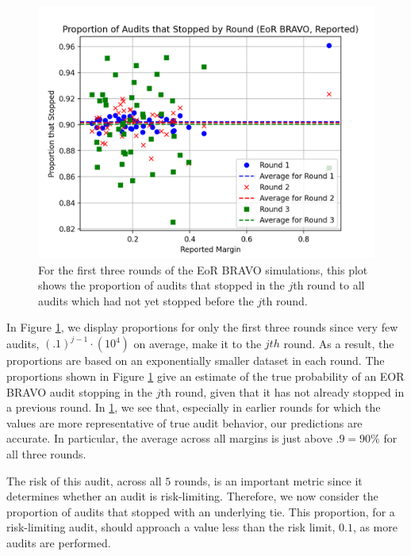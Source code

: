 \documentclass[runningheads]{llncs}
\begin{document}
\begin{figure}
\includegraphics[width=\textwidth]{eor_bravo_90perc_10^4_corrected/sprob_first_three.png}\caption{
For the first three rounds of the EoR BRAVO simulations, this plot shows the proportion of audits that stopped in the $j$th round
to all audits which had not yet stopped before the $j$th round.}
\label{fig:eor_bravo_sprob}
\end{figure}

In Figure \ref{fig:eor_bravo_sprob}, we display proportions for only the first three rounds
since very few audits, $(.1)^{j-1}\cdot(10^4)$ on average, 
make it to the $jth$ round.
As  a result, the proportions are based on an exponentially smaller dataset in each round.
The proportions shown in Figure \ref{fig:eor_bravo_sprob} give an estimate
of the true probability of an EOR BRAVO audit stopping in the $j$th round,
given that it has not already stopped in a previous round. 
In \ref{fig:eor_bravo_sprob}, we see that, especially in earlier rounds for which 
the values are more representative of true audit behavior, 
our predictions are accurate.
In particular, the average across all margins is just above $.9=90\%$ for
all three rounds.

The risk of this audit, across all $5$ rounds, is an important metric since it determines whether an audit is risk-limiting.
Therefore, we now consider the proportion of audits that stopped with an underlying tie.
This proportion, for a risk-limiting audit, should approach a value less than the risk limit, $0.1$, as more audits are performed.
\end{document}
